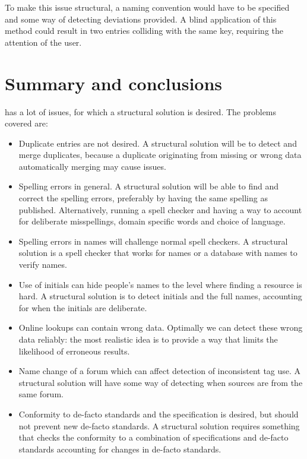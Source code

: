 To make this issue structural, a naming convention would have to be
specified and some way of detecting deviations provided.  A blind
application of this method could result in two entries colliding with
the same key, requiring the attention of the user.


\section{Summary and conclusions}
\label{sec:problems_conclusion}

{\bibtex} has a lot of issues, for which a structural solution is
desired.  The problems covered are:

\begin{itemize}
\item Duplicate entries are not desired.  A structural solution will
  be to detect and merge duplicates, because a duplicate originating
  from missing or wrong data automatically merging may cause issues.

\item Spelling errors in general.  A structural solution will be able
  to find and correct the spelling errors, preferably by having the
  same spelling as published.  Alternatively, running a spell checker
  and having a way to account for deliberate misspellings, domain
  specific words and choice of language.

\item Spelling errors in names will challenge normal spell checkers.
  A structural solution is a spell checker that works for names or a
  database with names to verify names.

\item Use of initials can hide people's names to the level where
  finding a resource is hard.  A structural solution is to detect
  initials and the full names, accounting for when the initials are
  deliberate.

\item Online lookups can contain wrong data.  Optimally we can detect
  these wrong data reliably: the most realistic idea is to provide a
  way that limits the likelihood of erroneous results.

\item Name change of a forum which can affect detection of
  inconsistent tag use.  A structural solution will have some way of
  detecting when sources are from the same forum.

\item Conformity to de-facto standards and the {\bibtex} specification
  is desired, but should not prevent new de-facto standards.  A
  structural solution requires something that checks the conformity to
  a combination of specifications and de-facto standards accounting
  for changes in de-facto standards.


\end{itemize}
